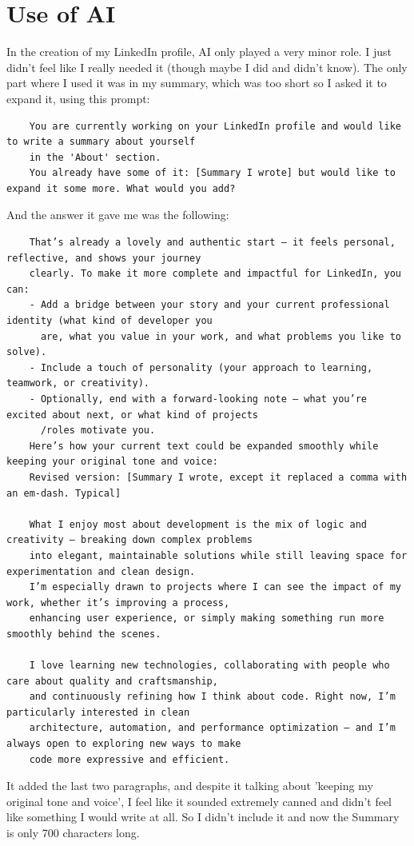 \documentclass{article}
\begin{document}
	\section{Use of AI}
	In the creation of my LinkedIn profile, AI only played a very minor role. I just didn't feel like I really needed it (though maybe I did and didn't know). The only part where I used it was in my summary, which was too short so I asked it to expand it, using this prompt: 
	\begin{verbatim}
	You are currently working on your LinkedIn profile and would like to write a summary about yourself
	in the 'About' section.
	You already have some of it: [Summary I wrote] but would like to expand it some more. What would you add?\end{verbatim}
	And the answer it gave me was the following: 
	\begin{verbatim}
	That’s already a lovely and authentic start — it feels personal, reflective, and shows your journey 
	clearly. To make it more complete and impactful for LinkedIn, you can:
	- Add a bridge between your story and your current professional identity (what kind of developer you 
	  are, what you value in your work, and what problems you like to solve).
	- Include a touch of personality (your approach to learning, teamwork, or creativity).
	- Optionally, end with a forward-looking note — what you’re excited about next, or what kind of projects
	  /roles motivate you.
	Here’s how your current text could be expanded smoothly while keeping your original tone and voice:
	Revised version: [Summary I wrote, except it replaced a comma with an em-dash. Typical]

	What I enjoy most about development is the mix of logic and creativity — breaking down complex problems 
	into elegant, maintainable solutions while still leaving space for experimentation and clean design. 
	I’m especially drawn to projects where I can see the impact of my work, whether it’s improving a process, 
	enhancing user experience, or simply making something run more smoothly behind the scenes.

	I love learning new technologies, collaborating with people who care about quality and craftsmanship, 
	and continuously refining how I think about code. Right now, I’m particularly interested in clean 
	architecture, automation, and performance optimization — and I’m always open to exploring new ways to make
	code more expressive and efficient.\end{verbatim}
	It added the last two paragraphs, and despite it talking about 'keeping my original tone and voice', I feel like it sounded extremely canned and didn't feel like something I would write at all. So I didn't include it and now the Summary is only 700 characters long.
\end{document}
